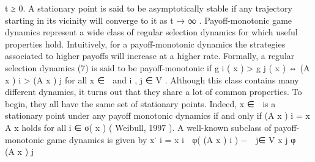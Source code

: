 \documentclass[a4paper]{article}
\begin{document}
t ≥ 0. A stationary point is said to be asymptotically stable if any
trajectory starting in its vicinity will converge to it as t → ∞ .
Payoff-monotonic game dynamics represent a wide class of
regular selection dynamics for which useful properties hold. Intuitively,
for a payoff-monotonic dynamics the strategies associated
to higher payoffs will increase at a higher rate. Formally, a regular
selection dynamics (7) is said to be payoff-monotonic if
g i ( x ) > g j ( x ) ⇔ (A x ) i > (A x ) j
for all x ∈  and i , j ∈ V .
Although this class contains many different dynamics, it turns
out that they share a lot of common properties. To begin, they
all have the same set of stationary points. Indeed, x ∈  is a
stationary point under any payoff monotonic dynamics if and only
if (A x ) i = x 	 A x holds for all i ∈ σ( x ) ( Weibull, 1997 ).
A well-known subclass of payoff-monotonic game dynamics is
given by
x˙ i = x i

φ( (A x ) i ) −

j∈ V
x j φ

(A x ) j
	
\end{document}
